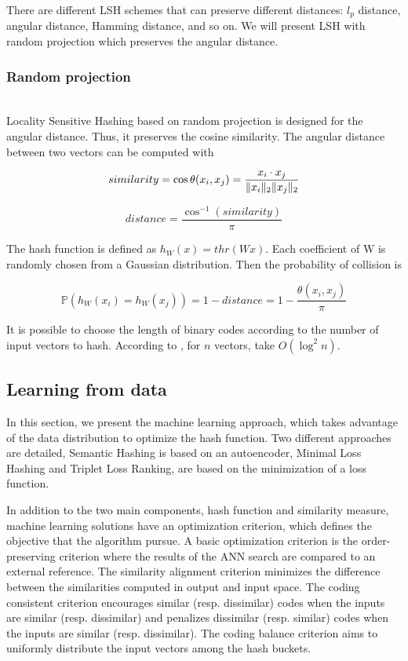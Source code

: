 There are different LSH schemes that can preserve different distances: $l_p$ distance, angular distance, Hamming distance, and so on. We will present LSH with random projection which preserves the angular distance.

\subsubsection{Random projection}
~\\
Locality Sensitive Hashing based on random projection \cite{charikar2002similarity} is designed for the angular distance. Thus, it preserves the cosine similarity. The angular distance between two vectors can be computed with

\[similarity=\cos{\theta{}(x_i, x_j)}=\frac{x_i\cdot{}x_j}{\lVert x_i\rVert_2\lVert x_j\rVert_2}\]

\[distance=\frac{\cos^{-1}(similarity)}{\pi}\]

The hash function is defined as $h_W(x)=thr(Wx)$. Each coefficient of W is randomly chosen from a Gaussian distribution. Then the probability of collision is 

\[\mathbb{P}(h_W(x_i)=h_W(x_j))=1-distance=1-\frac{\theta{}(x_i, x_j)}{\pi}\]

It is possible to choose the length of binary codes according to the number of input vectors to hash. According to \cite{DBLP:journals/corr/WangSSJ14}, for $n$ vectors, take $O(\log^2{n})$.

\subsection{Learning from data}
In this section, we present the machine learning approach, which takes advantage of the data distribution to optimize the hash function. Two different approaches are detailed, Semantic Hashing is based on an autoencoder, Minimal Loss Hashing and Triplet Loss Ranking, are based on the minimization of a loss function.

In addition to the two main components, hash function and similarity measure, machine learning solutions have an optimization criterion, which defines the objective that the algorithm pursue. A basic optimization criterion is the order-preserving criterion where the results of the ANN search are compared to an external reference. The similarity alignment criterion minimizes the difference between the similarities computed in output and input space. The coding consistent criterion encourages similar (resp. dissimilar) codes when the inputs are similar (resp. dissimilar) and penalizes dissimilar (resp. similar) codes when the inputs are similar (resp. dissimilar). The coding balance criterion aims to uniformly distribute the input vectors among the hash buckets.

